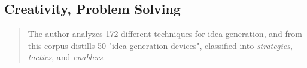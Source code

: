 

\subsection{Creativity, Problem Solving} 

		\begin{quote}
		\small
		The author analyzes 172 different techniques for idea generation,
		and from this corpus distills 50 "idea-generation devices",
		classified into {\em strategies}, {\em tactics}, and {\em enablers}.
		\end{quote}

